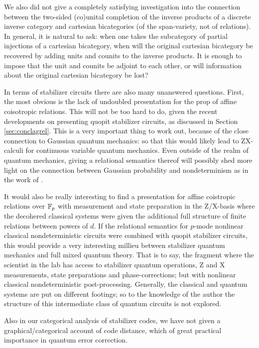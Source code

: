 \documentclass[12pt]{ociamthesis}  %
\begin{document}
We also did not give a completely satisfying investigation into the connection between the two-sided (co)unital completion of the inverse products of a discrete inverse category and cartesian bicategories (of the span-variety, not of relations).  In general, it is natural to ask: when one takes the subcategory of partial injections of a cartesian bicategory, when will the original cartesian bicategory be recovered by adding units and counits to the inverse products.  It is enough to impose that the unit and counits be adjoint to each other, or will information about the original cartesian bicategory be lost?


In terms of stabilizer circuits there are also many unanswered questions.  First, the most obvious is the lack of undoubled presentation for the prop of affine coisotropic relations.  This will not be too hard to do, given the recent developments on presenting quopit stabilizer circuits, as discussed in Section \ref{sec:conclagrel}.  This is a very important thing to work out, because of the close connection to Gaussian quantum mechanics: so that this would likely lead to ZX-calculi for continuous variable quantum mechanics.  Even outside of the realm of quantum mechanics, giving  a relational semantics thereof will possibly shed more light on the connection between Gaussian probability and nondeterminism as in the work of \cite{stein}.


It would also be really interesting to find a presentation for affine coistropic relations over $\mathbb{F}_p$ with measurement and state preparation in the Z/X-basis where the decohered classical systems were given the additional full structure of finite relations between powers of $d$.  If the relational semantics for $p$-mode nonlinear classical nondeterministic circuits were combined with quopit stabilizer circuits, this would provide a very interesting millieu between stabilizer quantum mechanics and full mixed quantum theory.  That is to say, the fragment where the scientist in the lab has access to stabilizer quantum operations, Z and X measurements, state preparations and phase-corrections; but with nonlinear classical nondeterministic post-processing.  Generally, the classical and quantum systems are put on different footings; so to the knowledge of the author the structure of this intermediate class of quantum circuits is not explored.

Also in our categorical analysis of stabilizer codes, we have not given a graphical/categorical account of code distance, which of great practical importance in quantum error correction. 
\end{document}
